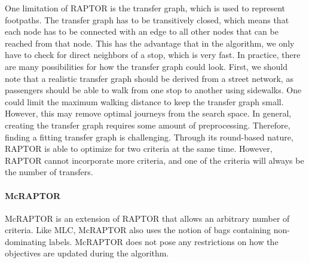 One limitation of RAPTOR is the transfer graph, which is used to represent footpaths.
The transfer graph has to be transitively closed, which means that each node has to be connected with an edge to all other nodes that can be reached from that node.
This has the advantage that in the algorithm, we only have to check for direct neighbors of a stop, which is very fast.
In practice, there are many possibilities for how the transfer graph could look.
First, we should note that a realistic transfer graph should be derived from a street network, as passengers should be able to walk from one stop to another using sidewalks.
One could limit the maximum walking distance to keep the transfer graph small.
However, this may remove optimal journeys from the search space.
In general, creating the transfer graph requires some amount of preprocessing.
Therefore, finding a fitting transfer graph is challenging.
Through its round-based nature, RAPTOR is able to optimize for two criteria at the same time.
However, RAPTOR cannot incorporate more criteria, and one of the criteria will always be the number of transfers.


\paragraph{McRAPTOR}
\label{subsubsec:mcraptor}

McRAPTOR  is an extension of RAPTOR that allows an arbitrary number of criteria.
Like MLC, McRAPTOR also uses the notion of bags containing non-dominating labels.
McRAPTOR does not pose any restrictions on how the objectives are updated during the algorithm.

